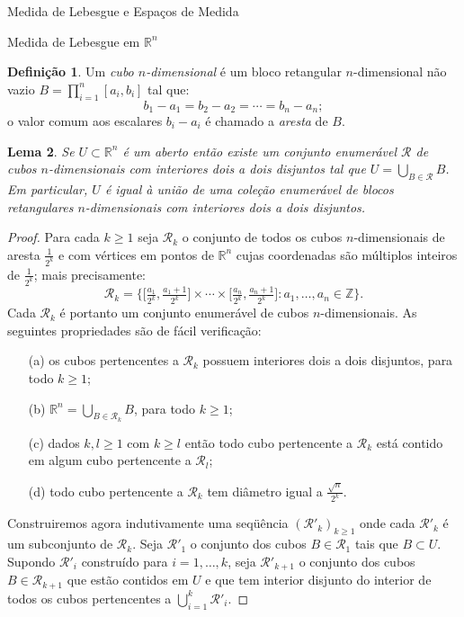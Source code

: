 \documentclass[oneside,final,11pt]{amsbook}
\newcommand{\R}{\mathds R}
\newcommand{\Z}{\mathds Z}
\theoremstyle{remark}\newtheorem{exercise}{Exercício}[chapter]
\theoremstyle{remark}\newtheorem{*exercise}[exercise]{\hbox to 0pt{\hskip 0pt minus 1fil*}Exercício}
\theoremstyle{definition}\newtheorem{exdefin}{Definição}[chapter]
\theoremstyle{plain}\newtheorem{teo}{Teorema}[section]
\theoremstyle{plain}\newtheorem{lem}[teo]{Lema}
\theoremstyle{plain}\newtheorem{prop}[teo]{Proposição}
\theoremstyle{plain}\newtheorem{cor}[teo]{Corolário}
\theoremstyle{definition}\newtheorem{defin}[teo]{Definição}
\theoremstyle{remark}\newtheorem{rem}[teo]{Observação}
\theoremstyle{definition}\newtheorem{notation}[teo]{Notação}
\theoremstyle{definition}\newtheorem{convention}[teo]{Convenção}
\theoremstyle{definition}\newtheorem{example}[teo]{Exemplo}
\numberwithin{section}{chapter}
\numberwithin{equation}{section}
\begin{document}
\begin{chapter}{Medida de Lebesgue e Espaços de Medida}
\begin{section}[Medida de Lebesgue em $\R^n$]{Medida de Lebesgue em ${\R^n}$}
\begin{defin}\label{thm:defcubo}
Um {\em cubo $n$-dimensional\/} é um bloco
retangular $n$-dimensional não vazio $B=\prod_{i=1}^n[a_i,b_i]$ tal que:
\[b_1-a_1=b_2-a_2=\cdots=b_n-a_n;\]
o valor comum aos escalares $b_i-a_i$ é chamado a {\em aresta\/}
de $B$.
\end{defin}

\begin{lem}\label{thm:abertocubos}
Se $U\subset\R^n$ é um aberto então existe um conjunto enumerável $\mathcal R$ de cubos $n$-dimensionais
com interiores dois a dois disjuntos tal que $U=\bigcup_{B\in\mathcal R}B$. Em particular,
$U$ é igual à união de uma coleção enumerável de blocos retangulares $n$-dimensionais
com interiores dois a dois disjuntos.
\end{lem}
\begin{proof}
Para cada $k\ge1$ seja $\mathcal R_k$ o conjunto de todos os cubos $n$-dimensionais de aresta $\frac1{2^k}$ e com vértices em pontos
de $\R^n$ cujas coordenadas são múltiplos inteiros de $\frac1{2^k}$; mais precisamente:
\[\mathcal R_k=\Big\{\big[\tfrac{a_1}{2^k},\tfrac{a_1+1}{2^k}\big]\times\cdots\times\big[\tfrac{a_n}{2^k},\tfrac{a_n+1}{2^k}\big]:
a_1,\ldots,a_n\in\Z\Big\}.\]
Cada $\mathcal R_k$ é portanto um conjunto enumerável de cubos $n$-dimensionais.
As seguintes propriedades são de fácil verificação:
\begin{itemize}
\item[(a)] os cubos pertencentes a $\mathcal R_k$ possuem interiores dois a dois disjuntos, para todo $k\ge1$;
\item[(b)] $\R^n=\bigcup_{B\in\mathcal R_k}B$, para todo $k\ge1$;
\item[(c)] dados $k,l\ge1$ com $k\ge l$ então todo cubo pertencente a $\mathcal R_k$ está contido em algum cubo
pertencente a $\mathcal R_l$;
\item[(d)] todo cubo pertencente a $\mathcal R_k$ tem diâmetro igual a $\frac{\sqrt n}{2^k}$.
\end{itemize}
Construiremos agora indutivamente uma seqüência $(\mathcal R'_k)_{k\ge1}$ onde cada $\mathcal R'_k$ é um subconjunto de $\mathcal R_k$.
Seja $\mathcal R'_1$ o conjunto dos cubos $B\in\mathcal R_1$ tais que $B\subset U$. Supondo $\mathcal R'_i$ construído
para $i=1,\ldots,k$, seja $\mathcal R'_{k+1}$ o conjunto dos cubos $B\in\mathcal R_{k+1}$ que estão contidos em $U$
e que tem interior disjunto do interior de todos os cubos pertencentes a $\bigcup_{i=1}^k\mathcal R'_i$.

\end{proof}
\end{section}
\end{chapter}
\end{document}
